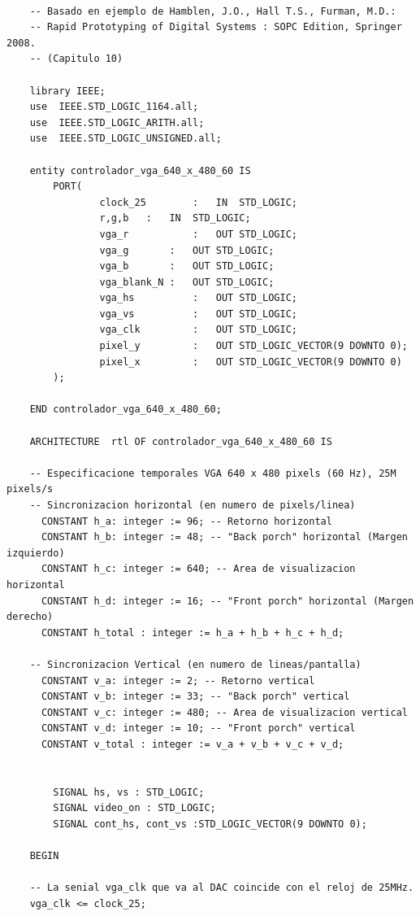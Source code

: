 \begin{lstlisting}

    -- Basado en ejemplo de Hamblen, J.O., Hall T.S., Furman, M.D.:
    -- Rapid Prototyping of Digital Systems : SOPC Edition, Springer 2008.
    -- (Capitulo 10) 

    library IEEE;
    use  IEEE.STD_LOGIC_1164.all;
    use  IEEE.STD_LOGIC_ARITH.all;
    use  IEEE.STD_LOGIC_UNSIGNED.all;
    
    entity controlador_vga_640_x_480_60 IS
        PORT(	
                clock_25		: 	IN	STD_LOGIC;
                r,g,b	: 	IN	STD_LOGIC;
                vga_r			:	OUT	STD_LOGIC;
                vga_g		:	OUT	STD_LOGIC;
                vga_b		:	OUT	STD_LOGIC;
                vga_blank_N	:	OUT	STD_LOGIC;
                vga_hs			:	OUT STD_LOGIC;
                vga_vs			:	OUT STD_LOGIC;
                vga_clk			:	OUT STD_LOGIC;
                pixel_y			:	OUT STD_LOGIC_VECTOR(9 DOWNTO 0);
                pixel_x			:	OUT	STD_LOGIC_VECTOR(9 DOWNTO 0)
        );		
                
    END controlador_vga_640_x_480_60;
    
    ARCHITECTURE  rtl OF controlador_vga_640_x_480_60 IS
    
    -- Especificacione temporales VGA 640 x 480 pixels (60 Hz), 25M pixels/s
    -- Sincronizacion horizontal (en numero de pixels/linea)
      CONSTANT h_a: integer := 96; -- Retorno horizontal
      CONSTANT h_b: integer := 48; -- "Back porch" horizontal (Margen izquierdo)
      CONSTANT h_c: integer := 640; -- Area de visualizacion horizontal 
      CONSTANT h_d: integer := 16; -- "Front porch" horizontal (Margen derecho)  
      CONSTANT h_total : integer := h_a + h_b + h_c + h_d;  
       
    -- Sincronizacion Vertical (en numero de lineas/pantalla)  
      CONSTANT v_a: integer := 2; -- Retorno vertical
      CONSTANT v_b: integer := 33; -- "Back porch" vertical
      CONSTANT v_c: integer := 480; -- Area de visualizacion vertical 
      CONSTANT v_d: integer := 10; -- "Front porch" vertical 
      CONSTANT v_total : integer := v_a + v_b + v_c + v_d;  
     
        
        SIGNAL hs, vs : STD_LOGIC;
        SIGNAL video_on : STD_LOGIC;
        SIGNAL cont_hs, cont_vs :STD_LOGIC_VECTOR(9 DOWNTO 0);
    
    BEGIN
    
    -- La senial vga_clk que va al DAC coincide con el reloj de 25MHz. 
    vga_clk <= clock_25;
    

\end{lstlisting}
